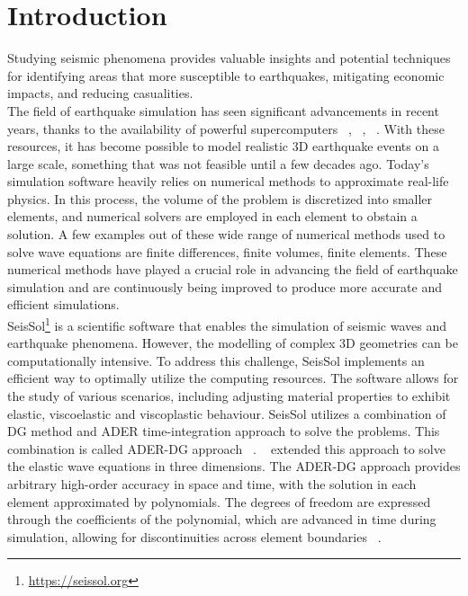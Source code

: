 
\chapter{Introduction}\label{chapter:introduction}

Studying seismic phenomena provides valuable insights and potential techniques for identifying areas that more susceptible to earthquakes, mitigating economic impacts, 
and reducing casualities. \\

The field of earthquake simulation has seen significant advancements in recent years, thanks to the availability of powerful supercomputers ~\parencite{inproceedings}, ~\parencite{breuer}, ~\parencite{seissol}.
With these resources, it has become possible to model realistic 3D earthquake events on a large scale, something that was not feasible until a few decades ago. 
Today's simulation software heavily relies on numerical methods to approximate real-life physics. In this process, the volume of the problem is discretized into smaller elements, and numerical solvers are employed in each element to obstain a solution.
A few examples out of these wide range of numerical methods used to solve wave equations are finite differences, finite volumes, finite elements. These numerical methods have played a crucial role in advancing the field of earthquake simulation and are continuously being improved to produce more accurate and efficient simulations. \\

SeisSol\footnote{\href{https://seissol.org}{https://seissol.org}} is a scientific software that enables the simulation of seismic waves and earthquake phenomena. 
However, the modelling of complex 3D geometries can be computationally intensive. To address this challenge, SeisSol implements an efficient way to optimally utilize the computing resources. 
The software allows for the study of various scenarios, including adjusting material properties to exhibit elastic, viscoelastic and viscoplastic behaviour.
SeisSol utilizes a combination of \acf{DG} method and \acf{ADER} time-integration approach to solve the problems.
This combination is called \ac{ADER}-\ac{DG} approach ~\parencite{dumbser}. ~\parencite{dumbser1} extended this approach to solve the elastic wave equations in three dimensions. The \ac{ADER}-\ac{DG} approach provides arbitrary high-order accuracy in space and time, with the solution in each element approximated by polynomials.
The degrees of freedom are expressed through the coefficients of the polynomial, which are advanced in time during simulation, allowing for discontinuities across element boundaries ~\parencite{martin}. \\

